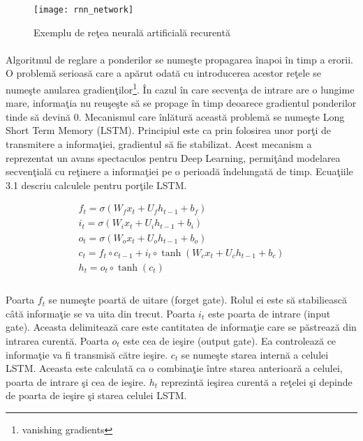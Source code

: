 \begin{figure}[H]
\centering
\texttt{[image: rnn\_network]}
\caption{Exemplu de re\c tea neural\u a artificial\u a recurent\u a}
\end{figure}

\paragraph{}
Algoritmul de reglare a ponderilor se nume\c ste propagarea \^ inapoi \^ in timp a erorii. O problem\u a serioas\u a care a ap\u arut odat\u a cu introducerea acestor re\c tele se nume\c ste anularea gradien\c tilor\footnote{vanishing gradients}. \^ In cazul \^ in care secven\c ta de intrare are o lungime mare, informa\c tia nu reu\c se\c ste s\u a se propage \^ in timp deoarece gradientul ponderilor tinde s\u a devin\u a \(0\). Mecanismul care \^ inl\u atur\u a aceast\u a problem\u a se nume\c ste Long Short Term Memory (LSTM). Principiul este ca prin folosirea unor por\c ti de transmitere a informa\c tiei, gradientul s\u a fie stabilizat. Acest mecanism a reprezentat un avans spectaculos pentru Deep Learning, permi\c t\^ and modelarea secven\c tial\u a cu re\c tinere a informa\c tiei pe o perioad\u a \^ indelungat\u a de timp. Ecua\c tiile 3.1 descriu calculele pentru por\c tile LSTM.

\begin{equation}
\begin{split}
f_{t} = \sigma(W_{f}x_{t} + U_{f}h_{t-1} + b_{f})\\
i_{t} = \sigma(W_{i}x_{t} + U_{i}h_{t-1} + b_{i})\\
o_{t} = \sigma(W_{o}x_{t} + U_{o}h_{t-1} + b_{o})\\
c_{t} = f_{t} \circ c_{t-1} + i_{t} \circ \tanh (W_{c}x_{t} + U_{c}h_{t-1} + b_{c})\\
h_{t} = o_{t} \circ \tanh (c_{t})\\
\end{split}
\end{equation}

\paragraph{}
Poarta \(f_{t}\) se nume\c ste poart\u a de uitare (forget gate). Rolul ei este s\u a stabilieasc\u a c\^ at\u a informa\c tie se va uita din trecut. Poarta \(i_{t}\) este poarta de intrare (input gate). Aceasta delimiteaz\u a care este cantitatea de informa\c tie care se p\u astreaz\u a din intrarea curent\u a. Poarta \(o_{t}\) este cea de ie\c sire (output gate). Ea controleaz\u a ce informa\c tie va fi transmis\u a c\u atre ie\c sire. \(c_{t}\) se nume\c ste starea intern\u a a celulei LSTM. Aceasta este calculat\u a ca o combina\c tie \^ intre starea anterioar\u a a celulei, poarta de intrare \c si cea de ie\c sire. \(h_{t}\) reprezint\u a ie\c sirea curent\u a a re\c telei \c si depinde de poarta de ie\c sire \c si starea celulei LSTM. 

